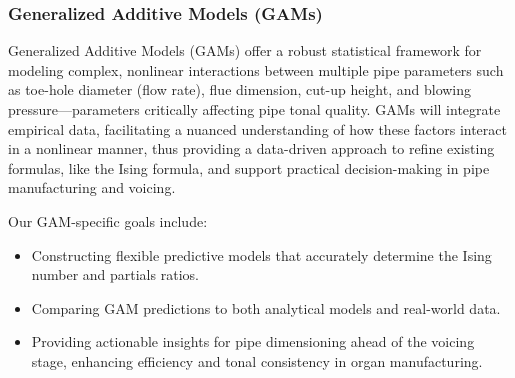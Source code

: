 \documentclass{psu-plan}
\begin{document}



\subsubsection{Generalized Additive Models (GAMs)}
Generalized Additive Models (GAMs) offer a robust statistical framework for modeling complex, 
nonlinear interactions between multiple pipe parameters such as toe-hole diameter (flow rate), flue dimension,
cut-up height, and blowing pressure—parameters critically affecting pipe tonal quality. 
GAMs will integrate empirical data, facilitating a nuanced understanding of how these factors interact in a nonlinear 
manner, thus providing a data-driven approach to refine existing formulas, like the Ising formula, and support 
practical decision-making in pipe manufacturing and voicing.

Our GAM-specific goals include:
\begin{itemize}
    \item Constructing flexible predictive models that accurately determine the Ising number and partials ratios.
    \item Comparing GAM predictions to both analytical models and real-world data.
    \item Providing actionable insights for pipe dimensioning ahead of the voicing stage, enhancing efficiency 
    and tonal consistency in organ manufacturing.
\end{itemize}
\end{document}

